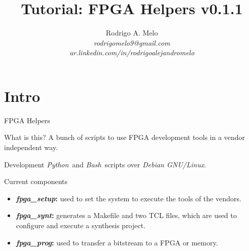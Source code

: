 \documentclass{beamer}
\title[FPGA Helpers]{Tutorial: FPGA Helpers v0.1.1}
\author{
  Rodrigo A. Melo\\
  \textit{rodrigomelo9@gmail.com}\\
  \textit{ar.linkedin.com/in/rodrigoalejandromelo}
}
\newcommand{\python}         {\textit{Python}}
\newcommand{\bash}           {\textit{Bash}}
\newcommand{\debian}         {\textit{Debian GNU/Linux}}
\newcommand{\fpgasetup}      {\textit{fpga\_setup}}
\newcommand{\fpgasynt}       {\textit{fpga\_synt}}
\newcommand{\fpgaprog}       {\textit{fpga\_prog}}
\begin{document}
\begin{frame}
  \titlepage
\end{frame}

\section{Intro}

\begin{frame}{FPGA Helpers}
  \begin{exampleblock}{What is this?}
    A bunch of scripts to use FPGA development tools in a vendor independent way.
  \end{exampleblock}
  \begin{block}{Development}
    \python\ and \bash\ scripts over \debian.
  \end{block}
\end{frame}

\begin{frame}{Current components}
  \begin{itemize}
    \item \textbf{\fpgasetup:} used to set the system to execute the tools of the vendors.
    \item \textbf{\fpgasynt:} generates a Makefile and two TCL files, which are used to
      configure and execute a synthesis project.
    \item \textbf{\fpgaprog:} used to transfer a bitstream to a FPGA or memory.
  \end{itemize}
\end{frame}

\end{document}
